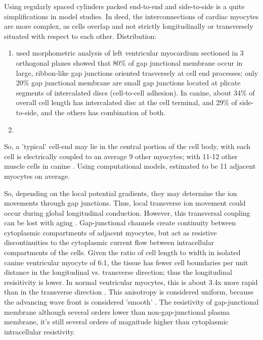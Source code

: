 Using regularly spaced cylinders packed end-to-end and side-to-side is a quite
simplifications in model studies. In deed, the interconnections of cardiac
myocytes are more complex, as cells overlap and not strictly longitudinally or
transversely situated with respect to each other. Distribution:
\begin{enumerate}
  \item \citep{hoyt1989} used morphometric analysis of left ventricular
  myocardium sectioned in 3 orthogonal planes showed that 80\% of gap junctional
  membrane occur in large, ribbon-like gap junctions oriented trasversely at
  cell end processes; only 20\% gap junctional membrane are small gap junctions
  located at plicate segments of intercalated discs (cell-to-cell adhesion). In
  canine, about 34\% of overall cell length has intercalated disc at the cell
  terminal, and 29\% of side-to-side, and the others has combination of both.
  
  \item
\end{enumerate}
So, a  'typical' cell-end may lie in the central portion of the cell body, with
each cell is electrically coupled to an average 9 other myocytes; with 11-12
other muscle cells in canine \citep{hoyt1989}. Using computational models,
\citep{rudy1991} estimated to be 11 adjacent myocytes on average.



So, depending on the local potential gradients, they may determine the ion
movements through gap junctions. Thus, local transverse ion movement could occur
during global longitudinal conduction. However, this transversal coupling can be
lost with aging \citep{spach1986}. Gap-junctional channels create continuity
between cytoplasmic compartments of adjacent myocytes, but act as resistive
discontinuities to the cytoplasmic current flow between intracellular
compartments of the cells. Given the ratio of cell length to width in isolated
canine ventricular myocyte of 6:1, the tissue has fewer cell boundaries per unit
distance in the longitudinal vs. transverse direction; thus the longitudinal
resisitivity is lower. In normal ventricular myocytes, this is about 3.4x more
rapid than in the transverse direction \citep{hoyt1989, saffitz1995}. This
anisotropy is considered uniform, because the advancing wave front is considered
'smooth' \citep{spach1982}. The resistivity of gap-junctional membrane although
several orders lower than non-gap-junctional plasma membrane, it's still several
orders of magnitude higher than cytoplasmic intracellular resistivity.

